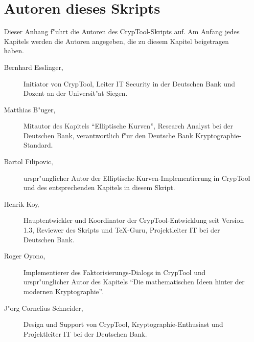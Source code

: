 \section{Autoren dieses Skripts}
\hypertarget{appendix-authors}{}\label{s:appendix-authors}

Dieser Anhang f"uhrt die Autoren des CrypTool-Skripts auf. Am Anfang jedes
Kapitels werden die Autoren angegeben, die zu diesem Kapitel beigetragen haben.

\begin{description}
\item[Bernhard Esslinger,] Initiator von CrypTool, Leiter IT Security in der Deutschen
Bank und Dozent an der Universit"at Siegen.
 
\item[Matthias B"uger,] Mitautor des Kapitels ``Elliptische Kurven'',
Research Analyst bei der Deutschen Bank, verantwortlich f"ur den Deutsche Bank
Kryptographie-Standard.

\item[Bartol Filipovic,] urspr"unglicher Autor der
Elliptische-Kurven-Implementierung in CrypTool und des entsprechenden Kapitels
in diesem Skript.

\item[Henrik Koy, ] Hauptentwickler und Koordinator der CrypTool-Entwicklung
seit Version 1.3, Reviewer des Skripts und \TeX{}-Guru, Projektleiter IT bei der
Deutschen Bank.

\item[Roger Oyono, ] Implementierer des Faktorisierungs-Dialogs in CrypTool und urspr"unglicher Autor des Kapitels "`Die mathematischen Ideen hinter der modernen Kryptographie"'.

\item[J"org Cornelius Schneider,] Design und Support von CrypTool,
Kryptographie-Enthusiast und Projektleiter IT bei der Deutschen Bank.

\end{description}

